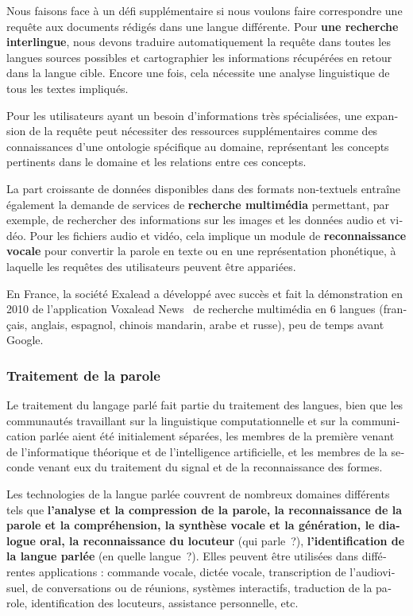 \begin{french}
\begin{multicols}{2}
Nous faisons face à un défi supplémentaire si nous voulons faire
correspondre une requête aux documents rédigés dans une langue
différente. Pour {\bf une recherche interlingue}, nous devons traduire
automatiquement la requête dans toutes les langues sources possibles
et cartographier les informations récupérées en retour dans la langue
cible. Encore une fois, cela nécessite une analyse linguistique de
tous les textes impliqués.

Pour les utilisateurs ayant un besoin d'informations très
spécialisées, une expansion de la requête peut nécessiter des
ressources supplémentaires comme des connaissances d'une ontologie
spécifique au domaine, représentant les concepts pertinents dans le
domaine et les relations entre ces concepts.

La part croissante de données disponibles dans des formats non-textuels
entraîne également la demande de services de {\bf recherche multimédia}
permettant, par exemple, de rechercher des informations sur les
images et les données audio et vidéo. Pour les fichiers audio et vidéo, cela
implique un module de {\bf reconnaissance vocale} pour convertir la parole
en texte ou en une représentation phonétique, à laquelle les requêtes
des utilisateurs peuvent être appariées.

En France, la société Exalead a développé avec succès et fait la démonstration en 2010 de 
l'application Voxalead News~\cite{voxaleadnews} de recherche multimédia en 6 langues
(français, anglais, espagnol, chinois mandarin, arabe et russe),
peu de temps avant Google.

\subsubsection{Traitement de la parole}
Le traitement du langage parlé fait partie du traitement des langues,
bien que les communautés travaillant sur la linguistique
computationnelle et sur la communication parlée aient été initialement
séparées, les membres de la première venant de l'informatique
théorique et de l'intelligence artificielle, et les membres de
la seconde venant eux du traitement du signal et de la reconnaissance
des formes.

Les technologies de la langue parlée couvrent de nombreux domaines
différents tels que {\bf l'analyse et la compression de la
  parole, la reconnaissance de la parole et la compréhension, la
  synthèse vocale et la génération, le dialogue oral, la
  reconnaissance du locuteur} (qui parle~?), {\bf l'identification de la langue parlée} (en quelle langue~?). Elles
peuvent être utilisées dans différentes applications : commande
vocale, dictée vocale, transcription de l'audiovisuel, de
conversations ou de réunions, systèmes interactifs, traduction de la
parole, identification des locuteurs, assistance personnelle, etc.


\end{multicols}
\end{french}
